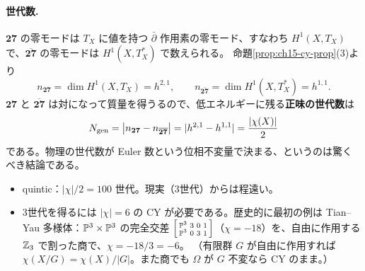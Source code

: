 \paragraph{世代数.}
$\mathbf{27}$ の零モードは $T_X$ に値を持つ $\bar\partial$ 作用素の零モード、すなわち $H^1(X,T_X)$ で、$\overline{\mathbf{27}}$ の零モードは $H^1(X,T^*_X)$ で数えられる。
命題\ref{prop:ch15-cy-prop}(3)より
\[
n_{\mathbf{27}} = \dim H^1(X,T_X) = h^{2,1},\qquad n_{\overline{\mathbf{27}}} = \dim H^1(X,T^*_X) = h^{1,1}.
\]
$\mathbf{27}$ と $\overline{\mathbf{27}}$ は対になって質量を得うるので、低エネルギーに残る\textbf{正味の世代数}は
\[
N_{\rm gen} = \big|n_{\mathbf{27}} - n_{\overline{\mathbf{27}}}\big| = |h^{2,1}-h^{1,1}| = \frac{|\chi(X)|}{2}
\]
である。物理の世代数が Euler 数という位相不変量で決まる、というのは驚くべき結論である。
\begin{itemize}
\item quintic：$|\chi|/2 = 100$ 世代。現実（3世代）からは程遠い。
\item 3世代を得るには $|\chi| = 6$ の CY が必要である。歴史的に最初の例は Tian--Yau 多様体：$\mathbb{P}^3\times\mathbb{P}^3$ の完全交差
$\left[\begin{smallmatrix}\mathbb{P}^3 & 3 & 0 & 1\\ \mathbb{P}^3 & 0 & 3 & 1\end{smallmatrix}\right]$（$\chi = -18$）を、自由に作用する $\mathbb{Z}_3$ で割った商で、$\chi = -18/3 = -6$。
（有限群 $G$ が自由に作用すれば $\chi(X/G) = \chi(X)/|G|$。また商でも $\Omega$ が $G$ 不変なら CY のまま。）
\end{itemize}

